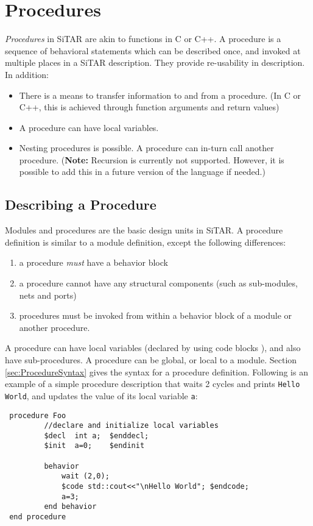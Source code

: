 	
	
	
	\section{Procedures}\label{sec:procedures}
	
	\textit{Procedures} in SiTAR are akin to functions in C or C++. 
	A procedure is a sequence of behavioral statements which can be 
	described once, and invoked at multiple places in a SiTAR
	description. They provide re-usability in description. 
	In addition:
	\begin{itemize}
	\item There is a means to transfer information to and from a procedure.
	(In C or C++, this is achieved through function arguments and return values)
	\item A procedure can have local variables.
	\item Nesting procedures is possible. A procedure can
	in-turn call another procedure. (\textbf{Note:} Recursion is
	currently not supported. However, it is possible to add this in a
	future version of the language if needed.)
	\end{itemize}

	


	\subsection{Describing a Procedure}
	Modules and procedures are the basic design units in SiTAR. A procedure definition 
	is similar to a module definition, except the following differences:
	\begin{enumerate}
	\item a procedure \emph{must} have a behavior block
	\item a procedure cannot have any structural components (such as sub-modules, nets and ports)
	\item procedures must be invoked from within a behavior block of a module or another procedure.
	\end{enumerate}
	A procedure can have local variables (declared by using code blocks ),
	and also have sub-procedures. A procedure can be global, or local to a module. 
	Section \ref{sec:ProcedureSyntax} gives the syntax for a procedure definition.
	Following is an example of a simple procedure description that waits 2 cycles 
	and prints \texttt{Hello World}, and updates the value of its local variable \texttt{a}:
\begin{verbatim}
 procedure Foo
         //declare and initialize local variables
         $decl  int a;  $enddecl;
         $init  a=0;    $endinit

         behavior 
             wait (2,0);
             $code std::cout<<"\nHello World"; $endcode;
             a=3;
         end behavior
 end procedure
\end{verbatim}


